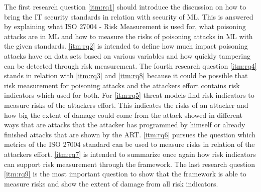 The first research question \ref{itm:rq1} should introduce the discussion on how to bring the IT security standards in relation with security of ML. This is answered by explaining what ISO 27004 - Risk
Measurement is used for, what poisoning attacks are in ML and how to measure the risks of poisoning attacks in ML with the given standards. \ref{itm:rq2} is intended to define how much impact poisoning
attacks have on data sets based on various variables and how quickly tampering can be detected through risk measurement. The fourth research question \ref{itm:rq4} stands in relation with \ref{itm:rq3} and \ref{itm:rq8} because it could be possible that risk measurement for poisoning attacks and the attackers effort contains risk indicators which used for both. For \ref{itm:rq5} threat models find risk indicators to measure risks of the attackers effort. This indicates the risks of an attacker and how big the extent of damage could come from the attack showed in different ways that are attacks that the attacker has programmed by himself or already finished attacks that are shown by the ART. \ref{itm:rq6} pursues the question which metrics of the ISO 27004 standard can be used to measure risks in relation of the attackers effort. \ref{itm:rq7} is intended to summarize once again how risk indicators can support risk measurement through the framework. The last research question \ref{itm:rq9} is the most important question to show that the framework is able to measure risks and show the extent of damage from all risk indicators.
